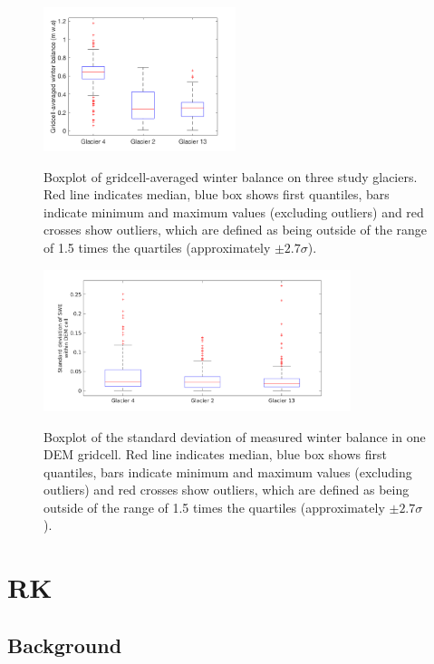 \documentclass[onecolumn, letterpaper]{igs}
\newcommand{\boxMatlab}{Red line indicates median, blue box shows first quantiles, bars indicate minimum and maximum values (excluding outliers) and red crosses show outliers, which are defined as being outside of the range of 1.5 times the quartiles (approximately $\pm2.7\sigma$). }
\renewcommand{\thefigure}{S\arabic{figure}}
\begin{document}
\renewcommand{\thefigure}{S\arabic{figure}}
\addtocounter{figure}{+1}

\begin{figure}[h!]
\centering
	\includegraphics[width =0.5\textwidth]{GridcellWB_boxplot.png}\\
	\caption{Boxplot of gridcell-averaged winter balance on three study glaciers. \boxMatlab}
	\label{fig:GridcellWB_boxplot}
\end{figure}

\begin{figure}[h!]
\centering
	\includegraphics[width = 0.8\textwidth]{DEMcellSTD.png}\\
	\caption[]{Boxplot of the standard deviation of measured winter balance in one DEM gridcell. \boxMatlab}
	\label{fig:DEMcellSTD}
\end{figure}



\section{RK}
\label{sec:regressionkriging}

\subsection{Background}
\end{document}

